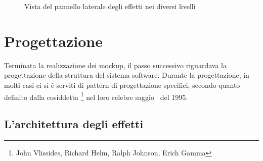 \begin{description}
\begin{figure}[htbp]
{              }%
              \qquad{\LARGE$\Rightarrow$}\qquad
              \caption{Vista del pannello laterale degli effetti nei diversi livelli\label{fig:mock:allEffects}}
          \end{figure}


        \end{description}

    \section{Progettazione}\label{sec:progettazione}
        Terminata la realizzazione dei mockup, il passo successivo riguardava la progettazione della struttura del sistema software. Durante la progettazione, in molti casi ci si è serviti di pattern di progettazione specifici, secondo quanto definito dalla cosiddetta \footnote{John Vlissides, Richard Helm, Ralph Johnson, Erich Gamma} nel loro celebre saggio~\cite{designPattern} del 1995.

        \subsection{L'architettura degli effetti}\label{sub:effetti}
